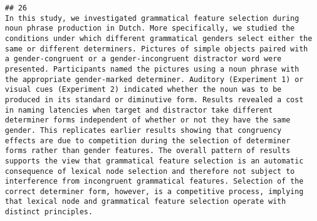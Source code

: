 \documentclass[
  english,
  man]{apa6}
\begin{document}
\begin{verbatim}
## 26                                                                                                                                                                                                                                                                                                                                                                                                                                                                                                                                                                                                                                                                                                                                                                                                                                                                                                                                                                                                                                                                                                                                                                                                                                                                                                                             In this study, we investigated grammatical feature selection during noun phrase production in Dutch. More specifically, we studied the conditions under which different grammatical genders select either the same or different determiners. Pictures of simple objects paired with a gender-congruent or a gender-incongruent distractor word were presented. Participants named the pictures using a noun phrase with the appropriate gender-marked determiner. Auditory (Experiment 1) or visual cues (Experiment 2) indicated whether the noun was to be produced in its standard or diminutive form. Results revealed a cost in naming latencies when target and distractor take different determiner forms independent of whether or not they have the same gender. This replicates earlier results showing that congruency effects are due to competition during the selection of determiner forms rather than gender features. The overall pattern of results supports the view that grammatical feature selection is an automatic consequence of lexical node selection and therefore not subject to interference from incongruent grammatical features. Selection of the correct determiner form, however, is a competitive process, implying that lexical node and grammatical feature selection operate with distinct principles.

\end{verbatim}
\end{document}
